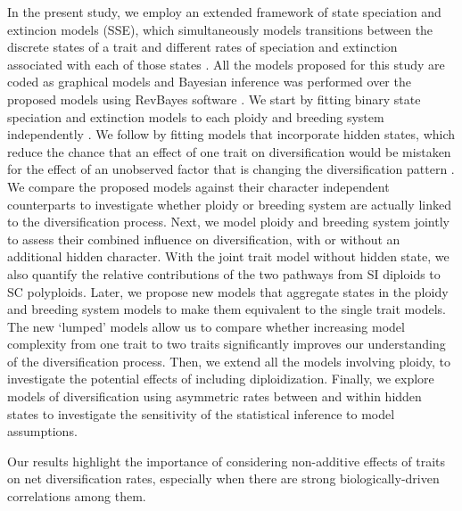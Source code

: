 In the present study, we employ an extended framework of state speciation and extincion models (SSE), which simultaneously models transitions between the discrete states of a trait and different rates of speciation and extinction associated with each of those states \citep{maddison_2007, fitzjohn_2012}.
All the models proposed for this study are coded as graphical models and Bayesian inference was performed over the proposed models using RevBayes software \citep{hoehna_2016}.
We start by fitting binary state speciation and extinction models to each ploidy and breeding system independently \citep{maddison_2007}. We follow by 
fitting models that incorporate hidden states, which reduce the chance that an effect of one trait on diversification would be mistaken for the effect of an unobserved factor that is changing the diversification pattern \citep{beaulieu_2016}.
We compare the proposed models against their character independent counterparts \citep{beaulieu_2016} to investigate whether ploidy or breeding system are actually linked to the diversification process.
Next, we model ploidy and breeding system jointly to assess their combined influence on diversification, with or without an additional hidden character. With the joint trait model without hidden state, we also quantify the relative contributions of the two pathways from SI diploids to SC polyploids.
Later, we propose new models that aggregate states in the ploidy and breeding system models to make them equivalent to the single trait models.
The new `lumped' models allow us to compare whether increasing model complexity from one trait to two traits significantly improves our understanding of the diversification process.
%
Then, we extend all the models involving ploidy, to investigate the potential effects of including diploidization.
Finally, we explore models of diversification using asymmetric rates between and within hidden states to investigate the sensitivity of the statistical inference to model assumptions.

Our results highlight the importance of considering non-additive effects of traits on net diversification rates, especially when there are strong biologically-driven correlations among them.
